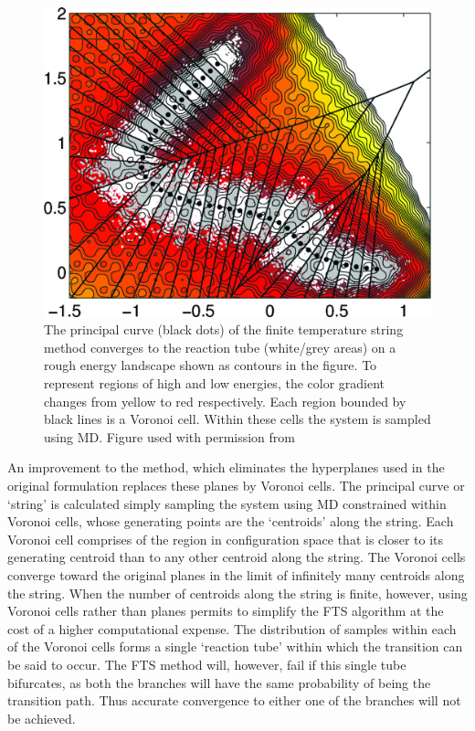 \documentclass{article}
\begin{document}
\begin{figure}[htp]
\centering
\includegraphics[scale=1.2]{MEP_fts}
\caption{The principal curve (black dots) of the finite temperature string method converges to the reaction tube (white/grey areas) on a rough energy landscape shown as contours in the figure. To represent regions of high and low energies, the color gradient changes from yellow to red respectively. Each region bounded by black lines is a Voronoi cell. Within these cells the system is sampled using MD. Figure used with permission from \cite{Vanden-Eijnden2009}}
 \label{fig:4}
\end{figure}

An improvement to the method, which eliminates the hyperplanes used in the original formulation replaces these planes by Voronoi cells. The principal curve or \enquote*{string} is calculated simply sampling the system using MD constrained within Voronoi cells, whose generating points are the \enquote*{centroids} along the string. Each Voronoi cell comprises of the region in configuration space that is closer to its generating centroid than to any other centroid along the string. The Voronoi cells converge toward the original planes in the limit of infinitely many centroids along the string. When the number of centroids along the string is finite, however, using Voronoi cells rather than planes permits to simplify the FTS algorithm at the cost of a higher computational expense. The distribution of samples within each of the Voronoi cells forms a single \enquote*{reaction tube} within which the transition can be said to occur. The FTS method will, however, fail if this single tube bifurcates, as both the branches will have the same probability of being the transition path. Thus accurate convergence to either one of the branches will not be achieved.
\end{document}

